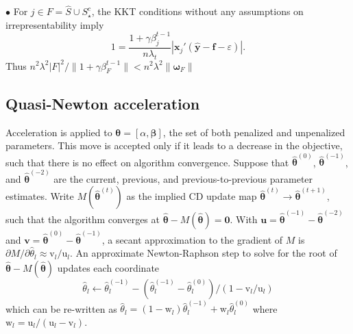 \documentclass[12pt]{article}
\newcommand{\sgl}{\setstretch{1.1}}
\newcommand{\bs}[1]{\boldsymbol{#1}}
\newcommand{\mr}[1]{\mathrm{#1}}
\newcommand{\bm}[1]{\mathbf{#1}}
\begin{document}
$\bullet$ For $j \in F=\hat S \cup S_\star^c$, the KKT conditions without any assumptions on irrepresentability imply
\[
1 = \frac{1+\gamma\beta_j^{t-1}}{n\lambda_t}|\bs{x}_j'(\bm{\hat y} - \bm{f}-\varepsilon)|.
\]
Thus $n^2\lambda^2|F|^2/\|1+\gamma\beta_F^{t-1}\| < n^2\lambda^2\|\bs{\omega}_F\|$

\subsection{Quasi-Newton acceleration}
\label{qn}

Acceleration is applied to $\bs{\theta} = [\alpha,\bs{\beta}]$, the
set of both penalized and unpenalized parameters.  This move is
accepted only if it leads to a decrease in the objective,
such that there is no effect on algorithm convergence.
Suppose that $\bs{\hat\theta}^{(0)}$, $\bs{\hat\theta}^{(-1)}$, and
$\bs{\hat\theta}^{(-2)}$ are the current, previous, and
previous-to-previous parameter estimates.  Write
$M(\bs{\hat\theta}^{(t)})$ as the implied CD update map
$\bs{\hat\theta}^{(t)} \rightarrow \bs{\hat\theta}^{(t+1)}$, such that
the algorithm converges at $\bs{\hat\theta} - M(\bs{\hat\theta}) =
\bm{0}$.  With $\bm{u} = \bs{\hat\theta}^{(-1)} -
\bs{\hat\theta}^{(-2)}$ and $\bm{v} = \bs{\hat\theta}^{(0)} -
\bs{\hat\theta}^{(-1)}$, a secant approximation to the gradient of $M$
is $\partial M/\partial \hat\theta_l \approx \mr{v}_l/\mr{u}_l$.  An
approximate Newton-Raphson step to solve for the root of
$\bs{\hat\theta} - M(\bs{\hat\theta}) $  updates each
coordinate
\[
\hat \theta_l \gets
\hat\theta_l^{(-1)} - (\hat\theta_l^{(-1)} -
\hat\theta_l^{(0)})/(1-\mr{v}_l/\mr{u}_l)
\] which can be re-written as $\hat\theta_l =
(1-\mr{w}_l)\hat\theta_l^{(-1)} + \mr{w}_l\hat\theta_l^{(0)} $ where
$\mr{w}_l = \mr{u}_l/(\mr{u}_l - \mr{v}_l)$.


\sgl\small


\end{document}
